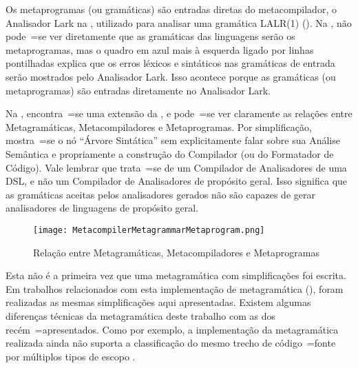 Os metaprogramas (ou gramáticas) são entradas diretas do metacompilador,
o Analisador Lark na ,
utilizado para analisar uma gramática LALR(1) ().
Na ,
não pode~=se ver diretamente que as gramáticas das linguagens serão os metaprogramas,
mas o quadro em azul mais à esquerda ligado por linhas pontilhadas explica que os erros léxicos e
sintáticos nas gramáticas de entrada serão mostrados pelo Analisador Lark.
Isso acontece porque as gramáticas (ou metaprogramas) são entradas diretamente no Analisador Lark.

Na ,
encontra~=se uma extensão da ,
e pode~=se ver claramente as relações entre Metagramáticas,
Metacompiladores e Metaprogramas. Por simplificação,
mostra~=se o nó ``Árvore Sintática'' sem explicitamente falar sobre sua Análise Semântica e
propriamente a construção do Compilador (ou do Formatador de Código).
Vale lembrar que trata~=se de um Compilador de Analisadores de uma DSL,
e não um Compilador de Analisadores de propósito geral.
Isso significa que as gramáticas aceitas pelos analisadores gerados não são capazes de gerar analisadores de linguagens de propósito geral.
\begin{figure}[!htb]
\caption{Relação entre Metagramáticas, Metacompiladores e Metaprogramas}
\label{figure:MetacompilerMetagrammarMetaprogram}
\centering
\texttt{[image: MetacompilerMetagrammarMetaprogram.png]}
\end{figure}

Esta não é a primeira vez que uma metagramática com simplificações foi escrita.
Em trabalhos relacionados com esta implementação de metagramática (),
foram realizadas as mesmas simplificações aqui apresentadas.
Existem algumas diferenças técnicas da metagramática deste trabalho com as dos recém~=apresentados.
Como por exemplo,
a implementação da metagramática realizada ainda não suporta a classificação do mesmo trecho de código~=fonte por múltiplos tipos de escopo \cite{vsCodeSyntaxHighlighthing}.

